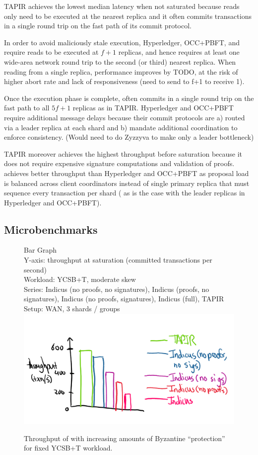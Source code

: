 TAPIR achieves the lowest median latency when not saturated because reads only
need to be executed at the nearest replica and it often commits transactions in
a single round trip on the fast path of its commit protocol.

In order to avoid maliciously stale execution, Hyperledger, OCC+PBFT, and \sys{} require reads to be executed at $f+1$ replicas, and hence requires at least one wide-area network round trip
to the second (or third) nearest replica. When reading from a single replica, performance improves by TODO, at the risk of higher abort rate and lack of responsiveness (need to send to f+1 to receive 1).

Once the execution phase is complete,
\sys{} often commits in a single round trip on the fast path to all $5f+1$
replicas as in TAPIR. Hyperledger and OCC+PBFT require additional message delays
because their commit protocols are a) routed via a leader replica at each shard and b) mandate additional coordination to enforce consistency. (Would need to do Zyzzyva to make only a leader bottleneck)

TAPIR moreover achieves the highest throughput before saturation because it does not
require expensive signature computations and validation of proofs. \sys{} achieves
better throughput than Hyperledger and OCC+PBFT as proposal load is balanced across client coordinators instead of single primary replica that must sequence every transaction per shard ( as is the case with the leader replicas in Hyperledger
and OCC+PBFT).


\subsection{Microbenchmarks}


\begin{figure}
  Bar Graph\\
  Y-axis: throughput at saturation (committed transactions per second)\\
  Workload: YCSB+T, moderate skew\\
  Series: Indicus (no proofs, no signatures), Indicus (proofs, no signatures),
    Indicus (no proofs, signatures), Indicus (full), TAPIR\\
  Setup: WAN, 3 shards / groups\\
  \includegraphics[width=\columnwidth]{figures/eval/bft-overhead-tput.png}
  \caption{Throughput of \sys{} with increasing amounts of Byzantine
  ``protection'' for fixed YCSB+T workload.}
  \label{fig:bft-overhead-tput}
\end{figure}

